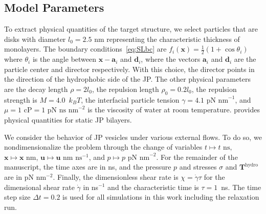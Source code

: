 \documentclass[lineno]{jfm}
\renewcommand{\aa}{\mathbf{a}}
\newcommand{\dd}{\mathbf{d}}
\newcommand{\xx}{\mathbf{x}}
\newcommand{\uu}{\mathbf{u}}
\begin{document}
\subsection{Model Parameters}
To extract physical quantities of the target structure, we select
particles that are disks with diameter $l_0 = 2.5$ nm representing the
characteristic thickness of monolayers. The boundary
conditions~\eqref{eq:SLbc} are $f_i(\xx) = \tfrac{1}{2}(1 + \cos
\theta_i)$ where $\theta_i$ is the angle between $\xx - \aa_i$ and
$\dd_i$, where the vectors $\aa_i$ and $\dd_i$ are the particle center
and director respectively. With this choice, the director points in the
direction of the hydrophobic side of the JP. The other physical
parameters are the decay length $\rho = 2 l_0$, the repulsion length
$\rho_0 = 0.2l_0$, the repulsion strength is $M=4.0$~$k_BT$, the
interfacial particle tension $\gamma = \text{4.1 pN nm}^{-1}$, and $\mu
= \text{1 cP} = \text{1 pN ns nm}^{-2}$ is the viscosity of water at
room temperature. \cite{Fu20} provides physical quantities for static JP
bilayers.


We consider the behavior of JP vesicles under various external flows.
To do so, we nondimensionalize the problem through the change of
variables 
$t \mapsto t \text{ ns},$ %
$\xx \mapsto \xx \text{ nm}$, %
$\uu \mapsto \uu \text{ nm ns}^{-1}$, and %
$p \mapsto p \text{ pN nm}^{-2}$.
For the remainder of the manuscript, the time axes are in ns, and the
pressure $p$ and stresses $\sigma$ and $\mathbf{T}^{\mathrm{hydro}}$ are
in pN nm$^{-2}$. Finally, the dimensionless shear rate is $\chi =
\dot\gamma \tau$ for the dimensional shear rate $\dot\gamma$ in
ns$^{-1}$ and the characteristic time is $\tau = 1$~ns. The time step
size $\Delta t=0.2$ is used for all simulations in this work including
the relaxation run.
\end{document}
